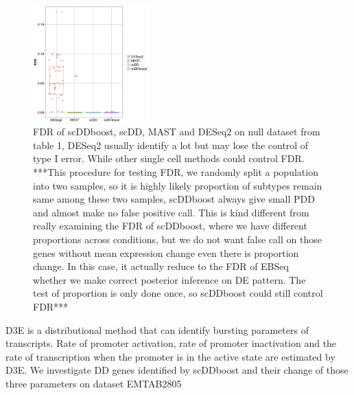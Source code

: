\documentclass[11pt]{amsart}
\begin{document}
\begin{figure}[H]
\includegraphics[width = 0.4\textwidth]{FDR.png}
 \caption{FDR of scDDboost, scDD, MAST and DESeq2 on null dataset from table 1, DESeq2 usually identify a lot but may lose the control of type I error. While other single cell methods could control FDR. ***This procedure for testing FDR,  we randomly split a population into two samples, so it is highly likely proportion of subtypes remain same among these two samples, scDDboost always give small PDD and almost make no false positive call. This is kind different from really examining the FDR of scDDboost, where we have different proportions across conditions, but we do not want false call on those genes without mean expression change even there is proportion change. In this case, it actually reduce to the FDR of EBSeq whether we make correct posterior inference on DE pattern. The test of proportion is only done once, so scDDboost could still control FDR*** }
  \label{fig:7}
\end{figure}

D3E\cite{ref:d3e} is a distributional method that can identify bursting parameters of transcripts. Rate of promoter activation, rate of promoter inactivation and the rate of transcription when the promoter is in the active state are estimated by D3E.  We investigate DD genes identified by scDDboost and their change of those three parameters on dataset EMTAB2805\\
\end{document}

